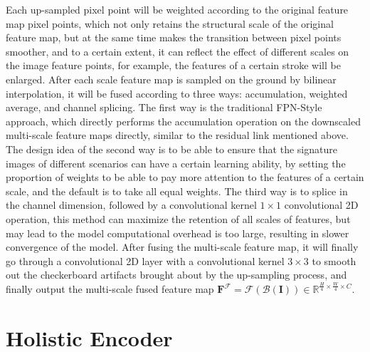 Each up-sampled pixel point will be weighted according to the original feature map pixel points, which not only retains the structural scale of the original feature map, but at the same time makes the transition between pixel points smoother, and to a certain extent, it can reflect the effect of different scales on the image feature points, for example, the features of a certain stroke will be enlarged.
After each scale feature map is sampled on the ground by bilinear interpolation, it will be fused according to three ways: accumulation, weighted average, and channel splicing. The first way is the traditional FPN-Style approach, which directly performs the accumulation operation on the downscaled multi-scale feature maps directly, similar to the residual link mentioned above. The design idea of the second way is to be able to ensure that the signature images of different scenarios can have a certain learning ability, by setting the proportion of weights to be able to pay more attention to the features of a certain scale, and the default is to take all equal weights. The third way is to splice in the channel dimension, followed by a convolutional kernel $1\times 1$ convolutional 2D operation, this method can maximize the retention of all scales of features, but may lead to the model computational overhead is too large, resulting in slower convergence of the model.
After fusing the multi-scale feature map, it will finally go through a convolutional 2D layer with a convolutional kernel $3\times 3$ to smooth out the checkerboard artifacts brought about by the up-sampling process, and finally output the multi-scale fused feature map $\mathbf{F}^\mathcal{F} = \mathcal{F}(\mathcal{B}(\mathbf{I})) \in \mathbb{R}^{\frac{H}{4}\times \frac{W}{4}\times C}$.

\section{Holistic Encoder}

